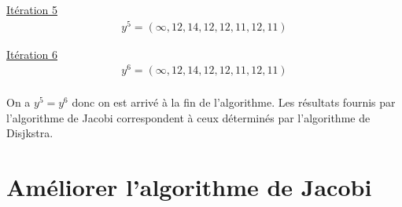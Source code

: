 \documentclass{article}
\begin{document}
\underline{Itération 5}\\

\begin{align*}
  y^5 = (\infty,12,14,12,12,11,12,11)
\end{align*}

\underline{Itération 6}\\

\begin{align*}
  y^6 = (\infty,12,14,12,12,11,12,11)
\end{align*}\\

On a $y^5 = y^6$ donc on est arrivé à la fin de l'algorithme. Les
résultats fournis par l'algorithme de Jacobi correspondent à ceux
déterminés par l'algorithme de Disjkstra.

\section{Améliorer l'algorithme de Jacobi}
\end{document}
